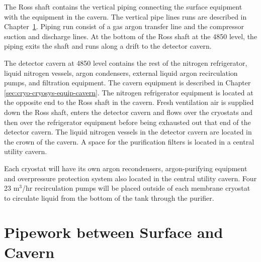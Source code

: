 The Ross shaft contains the vertical piping connecting the 
surface equipment with the equipment in the cavern. The vertical 
pipe lines runs are described in 
Chapter~\ref{sec:cryo-cryosys-pipework-surface-cav}. 
Piping run consist of a gas argon transfer line and the 
compressor suction and discharge lines. At the bottom of 
the Ross shaft at the 4850 level, the piping exits the 
shaft and runs along a drift to the detector cavern.

The detector cavern at 4850 level contains the rest of 
the nitrogen refrigerator, liquid nitrogen vessels, argon 
condensers, external liquid argon recirculation pumps, 
and filtration equipment. The cavern equipment is described 
in Chapter \ref{sec:cryo-cryosys-equip-cavern}. The nitrogen 
refrigerator equipment is located at the opposite end
to the Ross shaft in the cavern. Fresh ventilation 
air is supplied down the Ross shaft, enters the detector cavern 
and flows over the cryostats and then over the refrigerator
equipment before being exhausted out that end of the detector 
cavern. The liquid nitrogen vessels in the detector cavern 
are located in the crown of the cavern. A space for the
purification filters is located in a central utility cavern.

Each cryostat will have its own argon recondensers, 
argon-purifying equipment and overpressure protection system
also located in the central utility cavern. Four 23 m$^3$/hr 
recirculation pumps will be placed outside of each membrane 
cryostat to circulate 
liquid from the bottom of the tank through the purifier.


\chapter{Pipework between Surface and Cavern}
\label{sec:cryo-cryosys-pipework-surface-cav}

